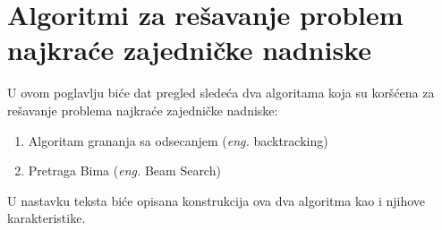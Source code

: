 \documentclass[12pt,oneside]{memoir}
\begin{document}

\chapter{Algoritmi za rešavanje problem najkraće zajedničke nadniske}
U ovom poglavlju biće dat pregled sledeća dva algoritama koja su koršćena za rešavanje problema najkraće zajedničke
nadniske:
\label{chap:algoritmi}

\begin{enumerate}
  \item Algoritam grananja sa odsecanjem (\textit{eng.} backtracking)
  \item Pretraga Bima (\textit{eng.} Beam Search)
\end{enumerate}
U nastavku teksta biće opisana konstrukcija ova dva algoritma kao i njihove karakteristike.
\end{document}
